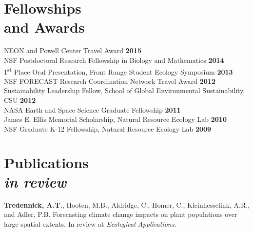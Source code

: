 \documentclass[margin,line]{resume}
\begin{document}
\begin{resume}
    \section{\mysidestyle Fellowships \\and Awards} 
        		NEON and Powell Center Travel Award \hfill \textbf{2015}\vspace{.5mm}\\%
                NSF Postdoctoral Research Fellowship in Biology and Mathematics    \hfill \textbf{2014}\vspace{.5mm}\\%
                1\textsuperscript{st} Place Oral Presentation, Front Range Student Ecology Symposium  \hfill \textbf{2013}\vspace{.5mm}\\%
                NSF FORECAST Research Coordination Network Travel Award \hfill \textbf{2012}\vspace{.5mm}\\%
                Sustainability Leadership Fellow, School of Global Environmental Sustainability, CSU \hfill \textbf{2012}\vspace{.5mm}\\%
		NASA Earth and Space Science Graduate Fellowship  \hfill \textbf{2011}\vspace{.5mm}\\%
		James E. Ellis Memorial Scholarship, Natural Resource Ecology Lab  \hfill \textbf{2010}\vspace{.5mm}\\%
		NSF Graduate K-12 Fellowship, Natural Resource Ecology Lab                        \hfill\textbf{2009}%
   
     \section{\mysidestyle Publications\\ \textsl{\footnotesize in review}}
     \textbf{Tredennick, A.T.}, Hooten, M.B., Aldridge, C., Homer, C., Kleinhesselink, A.R., and Adler, P.B. Forecasting climate change impacts on plant populations over large spatial extents. In review at \textsl{Ecological Applications}.
     

\end{resume}
\end{document}
